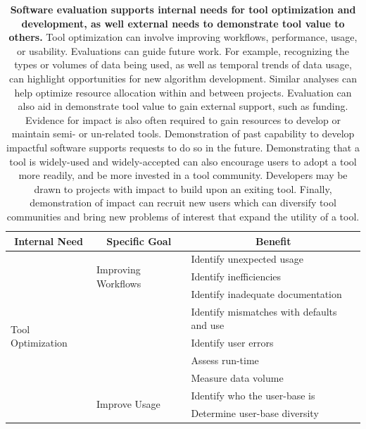 \documentclass{article}
\begin{document}
\begin{table}
 \caption{\textbf{Software evaluation supports internal needs for tool optimization and development, as well external needs to demonstrate tool value 
 to others.} Tool optimization can involve improving workflows, performance, usage, or usability. Evaluations can guide future work. For example, recognizing the types or volumes of data being used, as well as temporal trends of data usage, can highlight opportunities for new algorithm development. Similar analyses can help optimize resource allocation within and between projects. Evaluation can also aid in demonstrate tool value to gain external support, such as funding.  Evidence for impact is also often required to gain resources to develop or maintain semi- or un-related tools. Demonstration of past capability to develop impactful software supports requests to do so in the future.  Demonstrating that a tool is widely-used and widely-accepted can also encourage users to adopt a tool more readily, and be more invested in a tool community. Developers may be drawn to projects with impact to build upon an exiting tool. Finally, demonstration of impact can recruit new users which can diversify tool communities and bring new problems of interest that expand the utility of a tool.}
  \centering
  \begin{tabular} {|p{}|p{}|p{}|}
    \hline
    \multicolumn{1}{|c|}{\cellcolor[gray]{.9} \textbf{Internal Need}} 
    & \multicolumn{1}{|c|}{\cellcolor[gray]{.9} \textbf{Specific Goal}}
    & \multicolumn{1}{|c|}{\cellcolor[gray]{.9} \textbf{Benefit}}\\[1.1ex]
    \hline
    \multirow{17}{*}{Tool Optimization}               
    & \multirow{3}{*}{Improving Workflows} & 
    Identify unexpected usage \\
    & &
    Identify inefficiencies \\
    & &
    Identify inadequate documentation\\ \cline{2-3}
    &   \multirow{4}{*}{  }
    & 
     Identify mismatches with defaults and use \\
     &  Improve Performance  &
     Identify user errors \\
    &  &
    Assess run-time \\
    &  & 
     Measure data volume \\  \cline{2-3}
    & \multirow{5}{*}{ Improve Usage} & 
    Identify who the user-base is \\
    & &
    Determine user-base diversity \\

\end{tabular}
\end{table}
\end{document}
